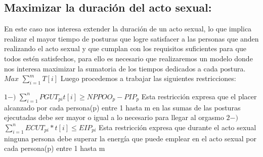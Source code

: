 \documentclass{llncs}
\begin{document}
\subsection{Maximizar la duración del acto sexual:}
En este caso nos interesa extender la duración de un acto sexual, lo que implica realizar el mayor tiempo de posturas que logre satisfacer a las personas que anden realizando el acto sexual y que cumplan con los requisitos suficientes para que todos estén satisfechos, para ello es necesario que realizaremos un modelo donde nos interesa maximizar la sumatoria de los tiempos dedicados a cada postura.
\newline
\newline
$Max$ $\sum_{i=1}^{m} T[i]$
\newline
\newline
Luego procedemos a trabajar las siguientes restricciones:

$1-)$ $\sum_{i=1}^{n} PGUT_{pi}t[i] \geq NPPOO_{p} - PIP_{p}$
\newline
\newline
Esta restricción expresa que el placer alcanzado por cada persona(p) entre 1 hasta m en las sumas de las posturas ejecutadas debe ser mayor o igual a lo necesario para llegar al orgasmo
\newline
\newline
$2-)$ $\sum_{i=1}^{n} ECUT_{pi}*t[i] \leq EIP_{pi}$
\newline
\newline
Esta restricción expresa que durante el acto sexual ninguna persona debe superar la energía que puede emplear en el acto sexual por cada persona(p) entre 1 hasta m
\end{document}
